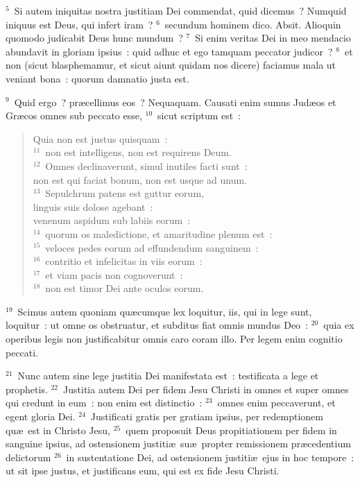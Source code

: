 ${}^{5}$~Si autem iniquitas nostra justitiam Dei commendat, quid dicemus~? Numquid iniquus est Deus, qui infert iram~?
${}^{6}$~secundum hominem dico. Absit. Alioquin quomodo judicabit Deus hunc mundum~?
${}^{7}$~Si enim veritas Dei in meo mendacio abundavit in gloriam ipsius~: quid adhuc et ego tamquam peccator judicor~?
${}^{8}$~et non (sicut blasphemamur, et sicut aiunt quidam nos dicere) faciamus mala ut veniant bona~: quorum damnatio justa est.


${}^{9}$~Quid ergo~? pr\ae cellimus eos~? Nequaquam. Causati enim sumus Jud\ae os et Gr\ae cos omnes sub peccato esse,
${}^{10}$~sicut scriptum est~: \begin{flushleft}\begin{verse}Quia non est justus quisquam~:\\
${}^{11}$~non est intelligens, non est requirens Deum.\\
${}^{12}$~Omnes declinaverunt, simul inutiles facti sunt~:\\ non est qui faciat bonum, non est usque ad unum.\\
${}^{13}$~Sepulchrum patens est guttur eorum,\\ linguis suis dolose agebant~:\\ venenum aspidum sub labiis eorum~:\\
${}^{14}$~quorum os maledictione, et amaritudine plenum est~:\\
${}^{15}$~veloces pedes eorum ad effundendum sanguinem~:\\
${}^{16}$~contritio et infelicitas in viis eorum~:\\
${}^{17}$~et viam pacis non cognoverunt~:\\
${}^{18}$~non est timor Dei ante oculos eorum.\end{verse}\end{flushleft}


${}^{19}$~Scimus autem quoniam qu\ae cumque lex loquitur, iis, qui in lege sunt, loquitur~: ut omne os obstruatur, et subditus fiat omnis mundus Deo~:
${}^{20}$~quia ex operibus legis non justificabitur omnis caro coram illo. Per legem enim cognitio peccati.


${}^{21}$~Nunc autem sine lege justitia Dei manifestata est~: testificata a lege et prophetis.
${}^{22}$~Justitia autem Dei per fidem Jesu Christi in omnes et super omnes qui credunt in eum~: non enim est distinctio~:
${}^{23}$~omnes enim peccaverunt, et egent gloria Dei.
${}^{24}$~Justificati gratis per gratiam ipsius, per redemptionem qu\ae\ est in Christo Jesu,
${}^{25}$~quem proposuit Deus propitiationem per fidem in sanguine ipsius, ad ostensionem justiti\ae\ su\ae\ propter remissionem pr\ae cedentium delictorum
${}^{26}$~in sustentatione Dei, ad ostensionem justiti\ae\ ejus in hoc tempore~: ut sit ipse justus, et justificans eum, qui est ex fide Jesu Christi.



